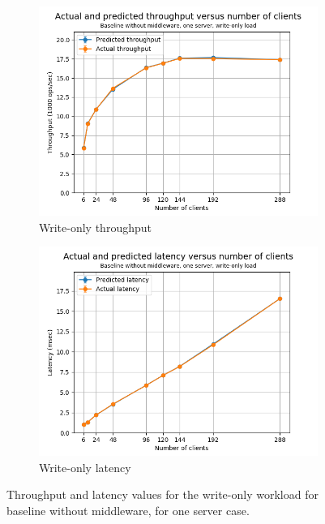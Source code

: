 \documentclass[11pt,a4paper]{article}
\begin{document}
\begin{figure}[h]
\centering
\begin{subfigure}{.5\textwidth}
  \centering
  \includegraphics[width=1.0\linewidth,trim={0px 0px 0px 0px},clip]{img/plot/csb1-wo-law_tpt.png}
  \caption{Write-only throughput}
  \label{fig:csb1-wo-law_tpt}
\end{subfigure}%
\begin{subfigure}{.5\textwidth}
  \centering
  \includegraphics[width=1.0\linewidth,trim={0px 0px 0px 0px},clip]{img/plot/csb1-wo-law_lat.png}
  \caption{Write-only latency}
  \label{fig:csb1-wo-law_lat}
\end{subfigure}
\caption{Throughput and latency values for the write-only workload for baseline without middleware, for one server case.}
\label{fig:csb1-wo-law}
\end{figure}
\end{document}
